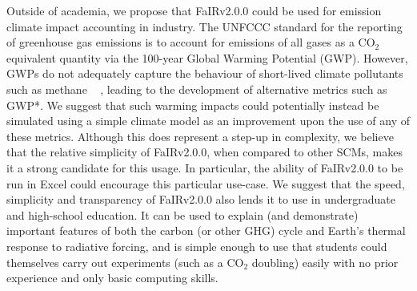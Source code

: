 \documentclass[gmd, manuscript]{copernicus}
\providecommand{\DIFadd}[1]{{\protect\color{blue}#1}} %
\providecommand{\DIFaddbegin}{} %
\providecommand{\DIFaddend}{} %
\begin{document}
\DIFadd{Outside of academia, we propose that FaIRv2.0.0 could be used for emission climate impact accounting in industry. The UNFCCC standard for the reporting of greenhouse gas emissions is to account for emissions of all gases as a CO$_2$ equivalent quantity via the 100-year Global Warming Potential (GWP). However, GWPs do not adequately capture the behaviour of short-lived climate pollutants such as methane \mbox{%
\citep{Cain2019}}\hspace{0pt}%
, leading to the development of alternative metrics such as GWP*. We suggest that such warming impacts could potentially instead be simulated using a simple climate model as an improvement upon the use of any of these metrics. Although this does represent a step-up in complexity, we believe that the relative simplicity of FaIRv2.0.0, when compared to other SCMs, makes it a strong candidate for this usage. In particular, the ability of FaIRv2.0.0 to be run in Excel could encourage this particular use-case.
We suggest that the speed, simplicity and transparency of FaIRv2.0.0 also lends it to use in undergraduate and high-school education. It can be used to explain (and demonstrate) important features of both the carbon (or other GHG) cycle and Earth's thermal response to radiative forcing, and is simple enough to use that students could themselves carry out experiments (such as a CO$_2$ doubling) easily with no prior experience and only basic computing skills.}\DIFaddend \\\\
\DIFaddbegin 
\end{document}
